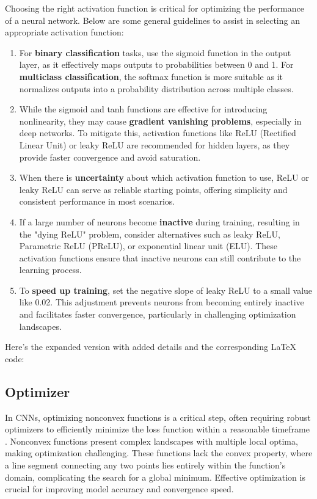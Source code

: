 Choosing the right activation function is critical for optimizing the performance of a neural network. Below are some general guidelines to assist in selecting an appropriate activation function:

\begin{enumerate}
	\item For \textbf{binary classification} tasks, use the sigmoid function in the output layer, as it effectively maps outputs to probabilities between 0 and 1. For \textbf{multiclass classification}, the softmax function is more suitable as it normalizes outputs into a probability distribution across multiple classes.
	
	\item While the sigmoid and tanh functions are effective for introducing nonlinearity, they may cause \textbf{gradient vanishing problems}, especially in deep networks. To mitigate this, activation functions like ReLU (Rectified Linear Unit) or leaky ReLU are recommended for hidden layers, as they provide faster convergence and avoid saturation.
	
	\item When there is \textbf{uncertainty} about which activation function to use, ReLU or leaky ReLU can serve as reliable starting points, offering simplicity and consistent performance in most scenarios.
	
	\item If a large number of neurons become \textbf{inactive} during training, resulting in the "dying ReLU" problem, consider alternatives such as leaky ReLU, Parametric ReLU (PReLU), or exponential linear unit (ELU). These activation functions ensure that inactive neurons can still contribute to the learning process.
	
	\item To \textbf{speed up training}, set the negative slope of leaky ReLU to a small value like 0.02. This adjustment prevents neurons from becoming entirely inactive and facilitates faster convergence, particularly in challenging optimization landscapes.
\end{enumerate}
Here’s the expanded version with added details and the corresponding LaTeX code:

\subsection{Optimizer}
\label{subsection:optimizer}

In CNNs, optimizing nonconvex functions is a critical step, often requiring robust optimizers to efficiently minimize the loss function within a reasonable timeframe \cite{Li:2021}. Nonconvex functions present complex landscapes with multiple local optima, making optimization challenging. These functions lack the convex property, where a line segment connecting any two points lies entirely within the function's domain, complicating the search for a global minimum. Effective optimization is crucial for improving model accuracy and convergence speed.

